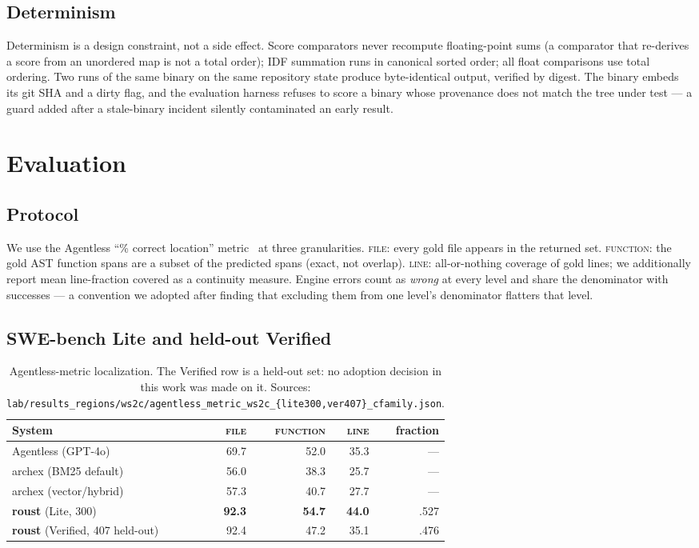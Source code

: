 \documentclass[11pt]{article}
\begin{document}
\subsection{Determinism}
Determinism is a design constraint, not a side effect. Score comparators never
recompute floating-point sums (a comparator that re-derives a score from an
unordered map is not a total order); IDF summation runs in canonical sorted
order; all float comparisons use total ordering. Two runs of the same binary
on the same repository state produce byte-identical output, verified by
digest. The binary embeds its git SHA and a dirty flag, and the evaluation
harness refuses to score a binary whose provenance does not match the tree
under test --- a guard added after a stale-binary incident silently
contaminated an early result.

\section{Evaluation}
\label{sec:eval}

\subsection{Protocol}
We use the Agentless ``\% correct location'' metric~\cite{agentless} at three
granularities. \textsc{file}: every gold file appears in the returned set.
\textsc{function}: the gold AST function spans are a subset of the predicted
spans (exact, not overlap). \textsc{line}: all-or-nothing coverage of gold
lines; we additionally report mean line-fraction covered as a continuity
measure. Engine errors count as \emph{wrong} at every level and share the
denominator with successes --- a convention we adopted after finding that
excluding them from one level's denominator flatters that level.

\subsection{SWE-bench Lite and held-out Verified}

\begin{table}[h]
\centering
\begin{tabular}{lrrrr}
\toprule
System & \textsc{file} & \textsc{function} & \textsc{line} & fraction \\
\midrule
Agentless (GPT-4o)~\cite{agentless} & 69.7 & 52.0 & 35.3 & --- \\
archex (BM25 default)               & 56.0 & 38.3 & 25.7 & --- \\
archex (vector/hybrid)              & 57.3 & 40.7 & 27.7 & --- \\
\textbf{roust} (Lite, 300)          & \textbf{92.3} & \textbf{54.7} & \textbf{44.0} & .527 \\
\textbf{roust} (Verified, 407 held-out) & 92.4 & 47.2 & 35.1 & .476 \\
\bottomrule
\end{tabular}
\caption{Agentless-metric localization. The Verified row is a held-out set:
no adoption decision in this work was made on it. Sources: \texttt{lab/results\_regions/ws2c/agentless\_metric\_ws2c\_\{lite300,ver407\}\_cfamily.json}.}
\end{table}
\end{document}
